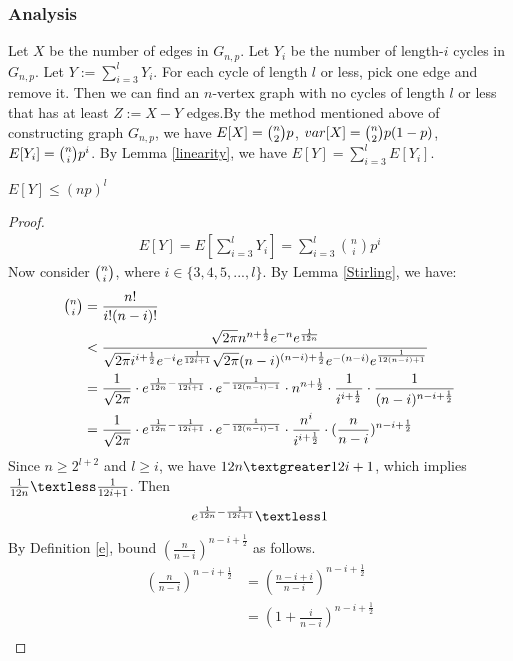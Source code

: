 \subsubsection{Analysis} 
Let $X$ be the number of edges in $G_{n,p}$. Let $Y_i$ be the number of length-$i$ cycles in $G_{n,p}$. Let $Y:=\sum_{i=3}^{l}Y_i$.
For each cycle of length $l$ or less, pick one edge and remove it.
Then we can find an $n$-vertex graph with no cycles of length $l$ or less that has at least $Z:=X-Y$ edges.By the method mentioned above of constructing graph $G_{n,p}$, we have $E[X]=\tbinom{n}{2}p$, $var[X]=\tbinom{n}{2}p(1-p)$, $E[Y_i]=\tbinom{n}{i}p^i$. By Lemma \ref{linearity}, we have $E[Y]=\sum_{i=3}^{l}E[Y_i]$.
\begin{claim}
$E[Y]\le (np)^l$
\end{claim}
\begin{proof}
\begin{align}
    \nonumber E[Y] = E[\sum_{i=3}^{l}Y_i]=\sum_{i = 3}^{l}{\binom{n}{i} p^i}
\end{align}
Now consider $\tbinom{n}{i}$, where $i\in\{3,4,5,...,l\}$. By Lemma \ref{Stirling}, we have:
\begin{align}
   \nonumber\tbinom{n}{i}&=\frac{n!}{i!(n-i)!}\\
    \nonumber&\textless \frac{\sqrt{2\pi}n^{n+\frac{1}{2}}e^{-n}e^{\frac{1}{12n}}}{\sqrt{2\pi}i^{i+\frac{1}{2}}e^{-i}e^{\frac{1}{12i+1}}\sqrt{2\pi}(n-i)^{(n-i)+\frac{1}{2}}e^{-(n-i)}e^{\frac{1}{12(n-i)+1}}}\\
    \nonumber &=\frac{1}{\sqrt{2\pi}}\cdot e^{\frac{1}{12n}-\frac{1}{12i+1}}\cdot e^{-\frac{1}{12(n-i)-1}} \cdot n^{n+\frac{1}{2}} \cdot \frac{1}{i^{i+\frac{1}{2}}} \cdot \frac{1}{(n-i)^{n-i+\frac{1}{2}}}\\
    &=\frac{1}{\sqrt{2\pi}}\cdot e^{\frac{1}{12n}-\frac{1}{12i+1}}\cdot e^{-\frac{1}{12(n-i)-1}} \cdot \frac{n^i}{i^{i+\frac{1}{2}}} \cdot (\frac{n}{n-i})^{n-i+\frac{1}{2}}\label{a}
\end{align}
Since $n\ge 2^{l+2}$ and $l\ge i$, we have $12n \textgreater 12i+1$, which implies $\frac{1}{12n} \textless \frac{1}{12i+1}$. Then
\begin{align}
     e^{\frac{1}{12n}-\frac{1}{12i+1}} \textless 1 \label{b}
\end{align}
By Definition \ref{e}, bound $(\frac{n}{n-i})^{n-i+\frac{1}{2}}$ as follows.
\begin{align}
    \nonumber (\frac{n}{n-i})^{n-i+\frac{1}{2}}
    &= (\frac{n-i+i}{n-i})^{n-i+\frac{1}{2}}\\
    \nonumber&= (1+\frac{i}{n-i})^{n-i+\frac{1}{2}}\\

\end{align}
\end{proof}

